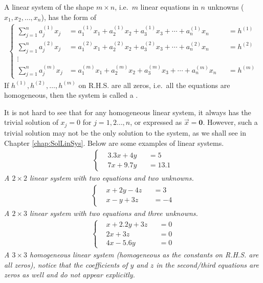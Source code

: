 \begin{defn}
\label{defn:linsys}
A linear system of the shape $m \times n$, i.e.\ $m$ linear equations in $n$ unknowns ($x_1, x_2, \ldots, x_n$), has the form of
\begin{align}
\label{eqn:linsys}
\left\{\begin{alignedat}{2}
\sum_{j=1}^n a_j^{(1)}x_j &= a_1^{(1)}x_1 + a_2^{(1)}x_2 + a_3^{(1)}x_3 + \cdots + a_n^{(1)}x_n & &= h^{(1)} \\
\sum_{j=1}^n a_j^{(2)}x_j &= a_1^{(2)}x_1 + a_2^{(2)}x_2 + a_3^{(2)}x_3 + \cdots + a_n^{(2)}x_n & &= h^{(2)} \\
\vdots \\
\sum_{j=1}^n a_j^{(m)}x_j &= a_1^{(m)}x_1 + a_2^{(m)}x_2 + a_3^{(m)}x_3 + \cdots + a_n^{(m)}x_n & &= h^{(m)} 
\end{alignedat}\right.
\end{align}
If $h^{(1)}, h^{(2)}, \ldots, h^{(m)}$ on R.H.S. are all zeros, i.e.\ all the equations are homogeneous, then the system is called a .
\end{defn}
It is not hard to see that for any homogeneous linear system, it always has the trivial solution of $x_j = 0$ for $j = 1, 2 \ldots, n$, or expressed as $\vec{x} = \textbf{0}$. However, such a trivial solution may not be the only solution to the system, as we shall see in Chapter \ref{chap:SolLinSys}. Below are some examples of linear systems.
\begin{align*}
\left\{\begin{alignedat}{2}
&3.3x + 4y& &= 5 \\
&7x + 9.7y& &= 13.1
\end{alignedat}\right.
\end{align*}
\textit{A $2 \times 2$ linear system with two equations and two unknowns.}
\begin{align}
\label{eqn:linsys1}
\left\{\begin{alignedat}{2}
&x + 2y - 4z& &= 3 \\
&x - y + 3z& &= -4
\end{alignedat}\right.
\end{align}
\textit{A $2 \times 3$ linear system with two equations and three unknowns.}
\begin{align}
\label{eqn:linsys2}
\left\{\begin{alignedat}{2}
&x + 2.2y + 3z& &= 0 \\
&2x + 3z& &= 0 \\
&4x - 5.6y& &= 0
\end{alignedat}\right.
\end{align}
\textit{A $3 \times 3$ homogeneous linear system (homogeneous as the constants on R.H.S. are all zeros), notice that the coefficients of $y$ and $z$ in the second/third equations are zeros as well and do not appear explicitly.}\par

